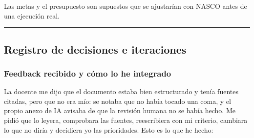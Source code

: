 \documentclass[
]{article}
\begin{document}
Las metas y el presupuesto son supuestos que se ajustarían con NASCO
antes de una ejecución real.

\begin{center}\rule{0.5\linewidth}{0.5pt}\end{center}

\hypertarget{registro-de-decisiones-e-iteraciones}{%
\subsection{Registro de decisiones e
iteraciones}\label{registro-de-decisiones-e-iteraciones}}

\hypertarget{feedback-recibido-y-cuxf3mo-lo-he-integrado}{%
\subsubsection{Feedback recibido y cómo lo he
integrado}\label{feedback-recibido-y-cuxf3mo-lo-he-integrado}}

La docente me dijo que el documento estaba bien estructurado y tenía
fuentes citadas, pero que no era mío: se notaba que no había tocado una
coma, y el propio anexo de IA avisaba de que la revisión humana no se
había hecho. Me pidió que lo leyera, comprobara las fuentes,
reescribiera con mi criterio, cambiara lo que no diría y decidiera yo
las prioridades. Esto es lo que he hecho:
\end{document}
